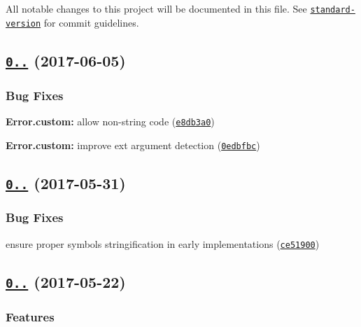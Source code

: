 All notable changes to this project will be documented in this file. See \href{https://github.com/conventional-changelog/standard-version}{\tt standard-\/version} for commit guidelines.

\label{_0.10.23}%
 \subsection*{\href{https://github.com/medikoo/es5-ext/compare/v0.10.22...v0.10.23}{\tt 0..} (2017-\/06-\/05)}

\subsubsection*{Bug Fixes}


\begin{DoxyItemize}
\item {\bfseries Error.\+custom\+:} allow non-\/string code (\href{https://github.com/medikoo/es5-ext/commit/e8db3a0}{\tt e8db3a0})
\item {\bfseries Error.\+custom\+:} improve {\ttfamily ext} argument detection (\href{https://github.com/medikoo/es5-ext/commit/0edbfbc}{\tt 0edbfbc})
\end{DoxyItemize}

\label{_0.10.22}%
 \subsection*{\href{https://github.com/medikoo/es5-ext/compare/v0.10.21...v0.10.22}{\tt 0..} (2017-\/05-\/31)}

\subsubsection*{Bug Fixes}


\begin{DoxyItemize}
\item ensure proper symbols stringification in early implementations (\href{https://github.com/medikoo/es5-ext/commit/ce51900}{\tt ce51900})
\end{DoxyItemize}

\label{_0.10.21}%
 \subsection*{\href{https://github.com/medikoo/es5-ext/compare/v0.10.20...v0.10.21}{\tt 0..} (2017-\/05-\/22)}

\subsubsection*{Features}


